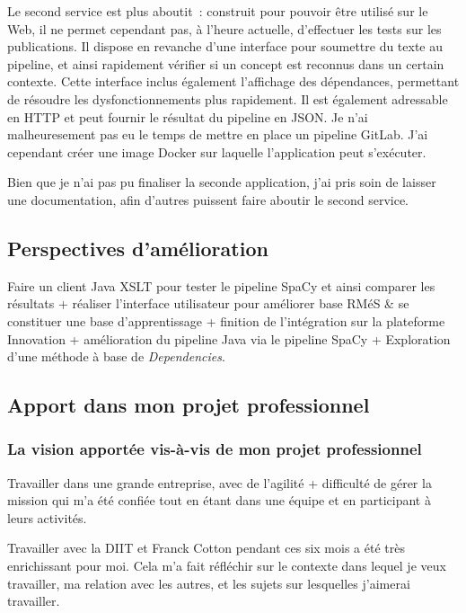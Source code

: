 Le second service est plus aboutit~: construit pour pouvoir être utilisé sur le Web, il ne permet cependant pas, à l'heure actuelle, d'effectuer les tests sur les publications. Il dispose en revanche d'une interface pour soumettre du texte au pipeline, et ainsi rapidement vérifier si un concept est reconnus dans un certain contexte. Cette interface inclus également l'affichage des dépendances, permettant de résoudre les dysfonctionnements plus rapidement. Il est également adressable en HTTP et peut fournir le résultat du pipeline en JSON. Je n'ai malheuresement pas eu le temps de mettre en place un pipeline GitLab. J'ai cependant créer une image Docker sur laquelle l'application peut s'exécuter.
\newline

Bien que je n'ai pas pu finaliser la seconde application, j'ai pris soin de laisser une documentation, afin d'autres puissent faire aboutir le second service. 

\subsection{Perspectives d'amélioration}

Faire un client Java XSLT pour tester le pipeline SpaCy et ainsi comparer les résultats + réaliser l'interface utilisateur pour améliorer base RMéS \& se constituer une base d'apprentissage + finition de l'intégration sur la plateforme Innovation + amélioration du pipeline Java via le pipeline SpaCy + Exploration d'une méthode à base de \textit{Dependencies}.

\subsection{Apport dans mon projet professionnel}
\subsubsection{La vision apportée vis-à-vis de mon projet professionnel}
Travailler dans une grande entreprise, avec de l'agilité + difficulté de gérer la mission qui m'a été confiée tout en étant dans une équipe et en participant à leurs activités.

Travailler avec la DIIT et Franck Cotton pendant ces six mois a été très enrichissant pour moi. Cela m'a fait réfléchir sur le contexte dans lequel je veux travailler, ma relation avec les autres, et les sujets sur lesquelles j'aimerai travailler.
\newline

